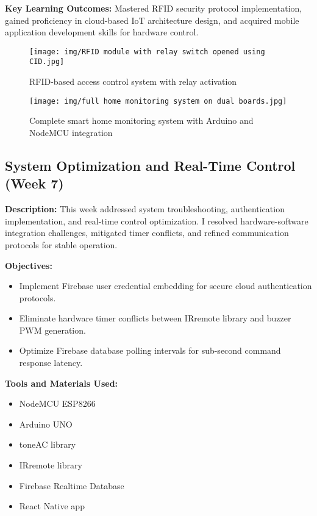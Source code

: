 \documentclass[12pt,a4paper]{report}
\begin{document}
\noindent\textbf{Key Learning Outcomes:} Mastered RFID security protocol implementation, gained proficiency in cloud-based IoT architecture design, and acquired mobile application development skills for hardware control.

\vspace{1.2cm}
\begin{figure}[H]
\centering
\begin{minipage}[t]{0.49\textwidth}
  \centering
  \texttt{[image: img/RFID module with relay switch opened using CID.jpg]}
  \caption{RFID-based access control system with relay activation}
  \label{fig:rfid-system}
\end{minipage}
\hfill
\begin{minipage}[t]{0.49\textwidth}
  \centering
  \texttt{[image: img/full home monitoring system on dual boards.jpg]}
  \caption{Complete smart home monitoring system with Arduino and NodeMCU integration}
  \label{fig:full-system}
\end{minipage}
\end{figure}

\newpage
\subsection{System Optimization and Real-Time Control (Week 7)}

\noindent\textbf{Description:} This week addressed system troubleshooting, authentication implementation, and real-time control optimization. I resolved hardware-software integration challenges, mitigated timer conflicts, and refined communication protocols for stable operation.

\noindent\textbf{Objectives:}
\begin{itemize}
    \item Implement Firebase user credential embedding for secure cloud authentication protocols.
    \item Eliminate hardware timer conflicts between IRremote library and buzzer PWM generation.
    \item Optimize Firebase database polling intervals for sub-second command response latency.
\end{itemize}

\noindent\textbf{Tools and Materials Used:}
\begin{multicols}{2}
\begin{itemize}
    \item NodeMCU ESP8266
    \item Arduino UNO
    \item toneAC library
    \item IRremote library
    \item Firebase Realtime Database
    \item React Native app
\end{itemize}
\end{multicols}
\end{document}
